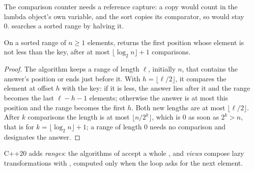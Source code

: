 \label{lst:b2:cpp-standard-library:lambdas}

\label{out:b2:cpp-standard-library:lambdas}

The comparison counter needs a reference capture: a copy would count in the lambda object's own variable, and the
sort copies its comparator, so  would stay 0.  searches a sorted range by
halving it.

\begin{proposition}\label{prop:b2:cpp-standard-library:lower-bound}
On a sorted range of $n \geq 1$ elements,  returns the first position whose element is not
less than the key, after at most $\lfloor \log_2 n \rfloor + 1$ comparisons.
\end{proposition}

\begin{proof}
The algorithm keeps a range of length $\ell$, initially $n$, that contains the answer's position or ends just
before it. With $h = \lfloor \ell / 2 \rfloor$, it compares the element at offset $h$ with the key: if it is less,
the answer lies after it and the range becomes the last $\ell - h - 1$ elements; otherwise the answer is at most
this position and the range becomes the first $h$. Both new lengths are at most $\lfloor \ell / 2 \rfloor$. After
$k$ comparisons the length is at most $\lfloor n / 2^k \rfloor$, which is 0 as soon as $2^k > n$, that is for
$k = \lfloor \log_2 n \rfloor + 1$; a range of length 0 needs no comparison and designates the answer.
\end{proof}

C++20 adds \emph{ranges}: the algorithms of  accept a whole , and \emph{views} compose
lazy transformations with \code{|}, computed only when the loop asks for the next element.

\label{lst:b2:cpp-standard-library:ranges}

\label{out:b2:cpp-standard-library:ranges}

